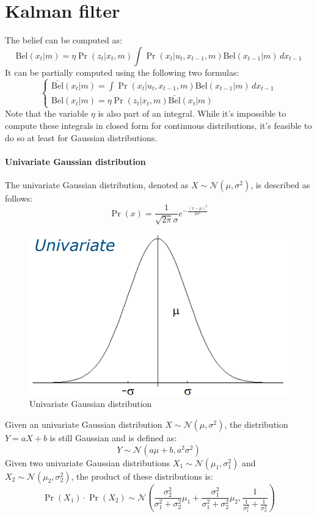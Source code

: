 \section{Kalman filter}

The belief can be computed as: 
\[\text{Bel}(x_t|m)=\eta\Pr(z_t|x_t,m)\int\Pr(x_t|u_t,x_{t-1},m)\text{Bel}(x_{t-1}|m)\,dx_{t-1}\]
It can be partially computed using the following two formulas:
\[\begin{cases}
    \bar{\text{Bel}}(x_t|m)=\int\Pr(x_t|u_t,x_{t-1},m)\text{Bel}(x_{t-1}|m)\,dx_{t-1} \\
    \text{Bel}(x_t|m)=\eta\Pr(z_t|x_t,m)\bar{\text{Bel}}(x_t|m)
\end{cases}\]
Note that the variable $\eta$ is also part of an integral.
While it's impossible to compute these integrals in closed form for continuous distributions, it's feasible to do so at least for Gaussian distributions.

\paragraph*{Univariate Gaussian distribution}
The univariate Gaussian distribution, denoted as $X\sim \mathcal{N}(\mu,\sigma^2)$, is described as follows:
\[\Pr(x)=\dfrac{1}{\sqrt{2\pi}\sigma}e^{-\frac{(x-\mu)^2}{2\sigma^2}}\]
\begin{figure}[H]
    \centering
    \includegraphics[width=0.6\linewidth]{images/ugd.png}
    \caption{Univariate Gaussian distribution}
\end{figure}
Given an univariate Gaussian distribution $X\sim \mathcal{N}(\mu,\sigma^2)$, the distribution $Y=aX+b$ is still Gaussian and is defined as:
\[Y\sim \mathcal{N}(a\mu+b,a^2\sigma^2)\]
Given two univariate Gaussian distributions $X_1\sim\mathcal{N}(\mu_1,\sigma_1^2)$ and $X_2\sim\mathcal{N}(\mu_2,\sigma_2^2)$, the product of these distributions is:
\[\Pr(X_1)\cdot\Pr(X_2)\sim\mathcal{N}\left(\dfrac{\sigma_2^2}{\sigma_1^2+\sigma_2^2}\mu_1+\dfrac{\sigma_1^2}{\sigma_1^2+\sigma_2^2}\mu_2,\dfrac{1}{\frac{1}{\sigma_1^2}+\frac{1}{\sigma_2^2}}\right)\]

